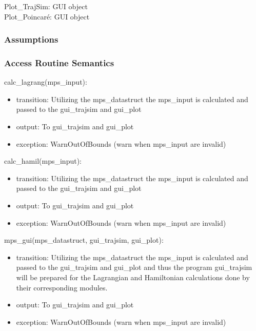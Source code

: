 \documentclass[12pt, titlepage]{article}
\begin{document}
\noindent Plot{\_}TrajSim: GUI object\\
Plot{\_}Poincar\'{e}: GUI object\\



\subsubsection{Assumptions}


\subsubsection{Access Routine Semantics}

\noindent calc\_lagrang(mps\_input):
\begin{itemize}
\item transition: Utilizing the mps\_datastruct the mps\_input is calculated 
and passed to the gui\_trajsim and gui\_plot  
\item output: To gui\_trajsim and gui\_plot  
\item exception: WarnOutOfBounds (warn when mps\_input are invalid) 
\end{itemize}

\noindent calc\_hamil(mps\_input):
\begin{itemize}
\item transition: Utilizing the mps\_datastruct the mps\_input is calculated 
and passed to the gui\_trajsim and gui\_plot  
\item output: To gui\_trajsim and gui\_plot  
\item exception: WarnOutOfBounds (warn when mps\_input are invalid) 
\end{itemize}

\noindent mps\_gui(mps\_datastruct, gui\_trajsim, gui\_plot):
\begin{itemize}
\item transition: Utilizing the mps\_datastruct the mps\_input is calculated 
and passed to the gui\_trajsim and gui\_plot 
and thus the program gui\_trajsim will be prepared for the Lagrangian and 
Hamiltonian calculations done by their corresponding modules.
\item output: To gui\_trajsim and gui\_plot  
\item exception: WarnOutOfBounds (warn when mps\_input are invalid) 
\end{itemize}
\end{document}
